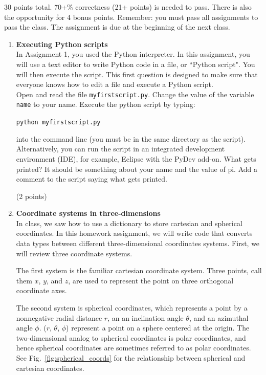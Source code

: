 \documentclass{article}
\newcounter{points}
\newcommand\setpoints[1]{\addtocounter{points}{#1}(#1 points)}
\begin{document}
\pagestyle{fancy}

30 points total.  70+\% correctness (21+ points) is needed to pass.  There is also the opportunity for 4 bonus points.  Remember: you must pass all assignments to pass the class.  The assignment is due at the beginning of the next class.

\begin{enumerate}
\item \textbf{Executing Python scripts} \\
In Assignment 1, you used the Python interpreter.  In this assignment, you will use a text editor to write Python code in a file, or ``Python script".  You will then execute the script.  This first question is designed to make sure that everyone knows how to edit a file and execute a Python script. \\

Open and read the file \texttt{myfirstscript.py}.  Change the value of the variable \texttt{name} to your name.  Execute the python script by typing:
\begin{center}
\texttt{python myfirstscript.py}
\end{center}
into the command line (you must be in the same directory as the script).  Alternatively, you can run the script in an integrated development environment (IDE), for example, Eclipse with the PyDev add-on.  What gets printed?  It should be something about your name and the value of pi.  Add a comment to the script saying what gets printed.  \setpoints{2}

\newpage

\item \textbf{Coordinate systems in three-dimensions} \\
In class, we saw how to use a dictionary to store cartesian and spherical coordinates.  In this homework assignment, we will write code that converts data types between different three-dimensional coordinates systems.  First, we will review three coordinate systems.

The first system is the familiar cartesian coordinate system.  Three points, call them $x$, $y$, and $z$, are used to represent the point on three orthogonal coordinate axes.

The second system is spherical coordinates, which represents a point by a nonnegative radial distance $r$, an an inclination angle $\theta$, and an azimuthal angle $\phi$.  ($r$, $\theta$, $\phi$) represent a point on a sphere centered at the origin.  The two-dimensional analog to spherical coordinates is polar coordinates, and hence spherical coordinates are sometimes referred to as polar coordinates.  See Fig.~\ref{fig:spherical_coords} for the relationship between spherical and cartesian coordinates.


\end{enumerate}
\end{document}

